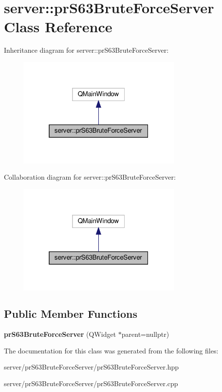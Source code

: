 \hypertarget{classserver_1_1pr_s63_brute_force_server}{}\section{server\+:\+:pr\+S63\+Brute\+Force\+Server Class Reference}
\label{classserver_1_1pr_s63_brute_force_server}


Inheritance diagram for server\+:\+:pr\+S63\+Brute\+Force\+Server\+:\nopagebreak
\begin{figure}[H]
\begin{center}
\leavevmode
\includegraphics[width=232pt]{classserver_1_1pr_s63_brute_force_server__inherit__graph}
\end{center}
\end{figure}


Collaboration diagram for server\+:\+:pr\+S63\+Brute\+Force\+Server\+:\nopagebreak
\begin{figure}[H]
\begin{center}
\leavevmode
\includegraphics[width=232pt]{classserver_1_1pr_s63_brute_force_server__coll__graph}
\end{center}
\end{figure}
\subsection*{Public Member Functions}
\begin{DoxyCompactItemize}
\item 
\mbox{\label{classserver_1_1pr_s63_brute_force_server_a50d074ec310fd67ed64de5bce5cff5ab}} 
{\bfseries pr\+S63\+Brute\+Force\+Server} (Q\+Widget $\ast$parent=nullptr)
\end{DoxyCompactItemize}


The documentation for this class was generated from the following files\+:\begin{DoxyCompactItemize}
\item 
server/pr\+S63\+Brute\+Force\+Server/pr\+S63\+Brute\+Force\+Server.\+hpp\item 
server/pr\+S63\+Brute\+Force\+Server/pr\+S63\+Brute\+Force\+Server.\+cpp\end{DoxyCompactItemize}
